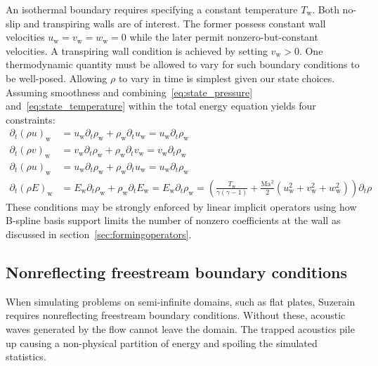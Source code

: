 \documentclass[letterpaper,11pt,nointlimits,reqno,draft]{amsbook}
\newcommand{\Mach}[1][]{\ensuremath{\mbox{Ma}_{#1}}}
\begin{document}
An isothermal boundary requires specifying a constant temperature
$T_\mathrm{w}$.  Both no-slip and transpiring walls are of interest.  The
former possess constant wall velocities $u_\mathrm{w} = v_\mathrm{w} =
w_\mathrm{w} = 0$ while the later permit nonzero-but-constant velocities.  A
transpiring wall condition is achieved by setting $v_\mathrm{w} > 0$.  One
thermodynamic quantity must be allowed to vary for such boundary conditions to
be well-posed.  Allowing $\rho$ to vary in time is simplest given our state
choices.  Assuming smoothness and combining~\eqref{eq:state_pressure}
and~\eqref{eq:state_temperature} within the total energy equation yields four
constraints:
\begin{align}
   \partial_t \left(\rho u\right)_\mathrm{w}
&= u_\mathrm{w} \partial_t \rho_\mathrm{w} + \rho_\mathrm{w} \partial_t u_\mathrm{w}
 = u_\mathrm{w} \partial_t \rho_\mathrm{w}
\\
   \partial_t \left(\rho v\right)_\mathrm{w}
&= v_\mathrm{w} \partial_t \rho_\mathrm{w} + \rho_\mathrm{w} \partial_t v_\mathrm{w}
 = v_\mathrm{w} \partial_t \rho_\mathrm{w}
\\
   \partial_t \left(\rho u\right)_\mathrm{w}
&= u_\mathrm{w} \partial_t \rho_\mathrm{w} + \rho_\mathrm{w} \partial_t u_\mathrm{w}
 = u_\mathrm{w} \partial_t \rho_\mathrm{w}
\\
   \partial_t \left(\rho E\right)_\mathrm{w}
&= E_\mathrm{w} \partial_t \rho_\mathrm{w} + \rho_\mathrm{w} \partial_t E_\mathrm{w}
 = E_\mathrm{w} \partial_t \rho_\mathrm{w}
 = \left(
     \frac{T_\mathrm{w}}{\gamma\left(\gamma-1\right)}
   + \frac{\Mach^2}{2}\left(u_\mathrm{w}^2+v_\mathrm{w}^2+w_\mathrm{w}^2\right)
   \right) \partial_{t} \rho
\end{align}
These conditions may be strongly enforced by linear implicit operators using
how B-spline basis support limits the number of nonzero coefficients at the
wall as discussed in section~\ref{sec:formingoperators}.

\subsection{Nonreflecting freestream boundary conditions}
\label{sec:nonreflectingbcs}

When simulating problems on semi-infinite domains, such as flat plates,
Suzerain requires nonreflecting freestream boundary conditions.  Without these,
acoustic waves generated by the flow cannot leave the domain.   The trapped
acoustics pile up causing a non-physical partition of energy and spoiling the
simulated statistics.
\end{document}
